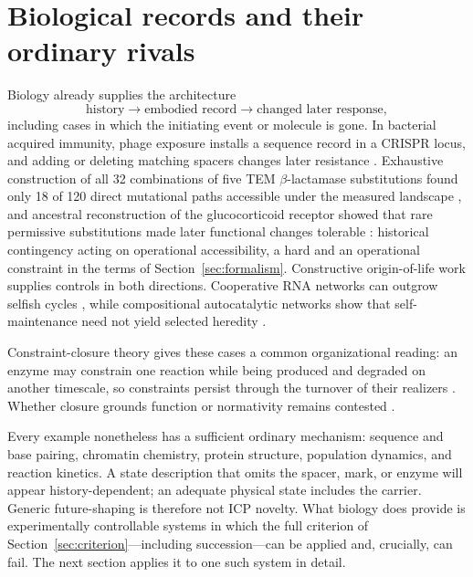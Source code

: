 \section{Biological records and their ordinary rivals}
\label{sec:biology}

Biology already supplies the architecture
\begin{equation}
 \text{history}\rightarrow\text{embodied record}
 \rightarrow\text{changed later response},
 \label{eq:bio-architecture}
\end{equation}
including cases in which the initiating event or molecule is gone. In bacterial
acquired immunity, phage exposure installs a sequence record in a CRISPR locus,
and adding or deleting matching spacers changes later resistance
\citep{BarrangouEtAl2007CRISPR}. Exhaustive construction of all 32
combinations of five TEM $\beta$-lactamase substitutions found only 18 of 120
direct mutational paths accessible under the measured landscape
\citep{WeinreichEtAl2006MutationalPaths}, and ancestral reconstruction of the
glucocorticoid receptor showed that rare permissive substitutions made later
functional changes tolerable \citep{HarmsThornton2014Contingency}: historical
contingency acting on operational accessibility, a hard and an operational
constraint in the terms of Section~\ref{sec:formalism}. Constructive
origin-of-life work supplies controls in both directions. Cooperative RNA
networks can outgrow selfish cycles \citep{VaidyaEtAl2012CooperativeRNA}, while
compositional autocatalytic networks show that self-maintenance need not yield
selected heredity \citep{VasasEtAl2010Evolvability}.

Constraint-closure theory gives these cases a common organizational reading:
an enzyme may constrain one reaction while being produced and degraded on
another timescale, so constraints persist through the turnover of their
realizers \citep{MontevilMossio2015Closure}. Whether closure grounds function or
normativity remains contested \citep{Garson2017AgainstOrganizational,
Corti2023OrganizationalNormativity}.

Every example nonetheless has a sufficient ordinary mechanism: sequence and
base pairing, chromatin chemistry, protein structure, population dynamics, and
reaction kinetics. A state description that omits the spacer, mark, or enzyme
will appear history-dependent; an adequate physical state includes the
carrier. Generic future-shaping is therefore not ICP novelty. What biology does
provide is experimentally controllable systems in which the full criterion of
Section~\ref{sec:criterion}---including succession---can be applied and,
crucially, can fail. The next section applies it to one such system in detail.
